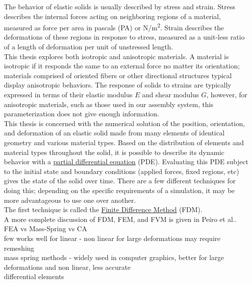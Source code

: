 {The behavior of elastic solids is usually described by stress and strain.  Stress describes the internal forces acting on neighboring regions of a material, measured as force per area in pascals (PA) or N/m\textsuperscript{2}.  Strain describes the deformations of these regions in response to stress, measured as a unit-less ratio of a length of deformation per unit of unstressed length.\\

This thesis explores both isotropic and anisotropic materials.  A material is isotropic if it responds the same to an external force no matter its orientation; materials comprised of oriented fibers or other directional structures typical display anisotropic behaviors.  The response of solids to strains are typically expressed in terms of their elastic modulus $E$ and shear modulus $G$, however, for anisotropic materials, such as those used in our assembly system, this parameterization does not give enough information.\\



This thesis is concerned with the numerical solution of the position, orientation, and deformation of an elastic solid made from many elements of identical geometry and various material types.  Based on the distribution of elements and material types throughout the solid, it is possible to describe its dynamic behavior with a \href{https://en.wikipedia.org/wiki/Partial_differential_equation}{partial differential equation} (PDE).  Evaluating this PDE subject to the initial state and boundary conditions (applied forces, fixed regions, etc) gives the state of the solid over time.  There are a few different techniques for doing this; depending on the specific requirements of a simulation, it may be more advantageous to use one over another.\\

The first technique is called the \href{https://en.wikipedia.org/wiki/Finite_difference_method}{Finite Difference Method} (FDM).  \\


A more complete discussion of FDM, FEM, and FVM is given in Peiro et al.\cite{Peiro2005}.\\

FEA vs Mass-Spring vs CA\\
few works well for linear - non linear for large deformations may require remeshing\\
mass spring methods - widely used in computer graphics, better for large deformations and non linear, less accurate\\
differential elements\\

}
